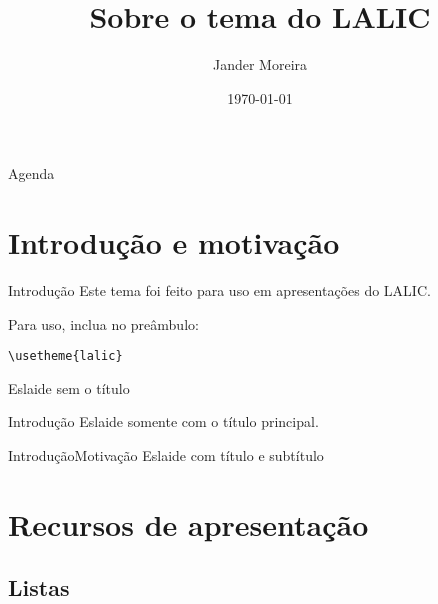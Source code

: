 \documentclass[
	brazilian, %
	12pt, %
]{beamer}
\title{Sobre o tema do LALIC}
\author{Jander Moreira}
\date{\today} %
\begin{document}
\begin{frame}
	\titlepage	
\end{frame}

\begin{frame}{Agenda}
	\tableofcontents
\end{frame}


%

\section{Introdução e motivação}
\begin{frame}{Introdução}
	Este tema foi feito para uso em apresentações do LALIC.
	
	\vspace{2em}
	Para uso, inclua no preâmbulo:
	
	\centering\texttt{\textbackslash usetheme\{lalic\}}
\end{frame}

\begin{frame}
	Eslaide sem o título
\end{frame}

\begin{frame}{Introdução}
	Eslaide somente com o título principal.
\end{frame}


\begin{frame}{Introdução}{Motivação}
	Eslaide com título e subtítulo
\end{frame}


\section[Recursos]{Recursos de apresentação}

\subsection{Listas}
\end{document}
